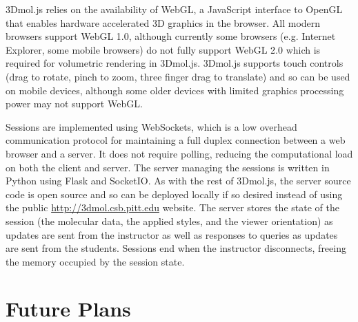 \documentclass[journal=jceda8,manuscript=article]{achemso}
\begin{document}
3Dmol.js relies on the availability of WebGL, a JavaScript interface to OpenGL that enables hardware accelerated 3D graphics in the browser.  All modern browsers support WebGL 1.0, although currently some browsers (e.g. Internet Explorer, some mobile browsers) do not fully support WebGL 2.0 which is required for volumetric rendering in 3Dmol.js.  3Dmol.js supports touch controls (drag to rotate, pinch to zoom, three finger drag to translate) and so can be used on mobile devices, although some older devices with limited graphics processing power may not support WebGL.

Sessions are implemented using WebSockets, which is a low overhead communication protocol for maintaining a full duplex connection between a web browser and a server.  It does not require polling, reducing the computational load on both the client and server. The server managing the sessions is written in Python using Flask and SocketIO.  As with the rest of 3Dmol.js, the server source code is open source and so can be deployed locally if so desired instead of using the public \url{http://3dmol.csb.pitt.edu} website. The server stores the state of the session (the molecular data, the applied styles, and the viewer orientation) as updates are sent from the instructor as well as responses to queries as updates are sent from the students.  Sessions end when the instructor disconnects, freeing the memory occupied by the session state.


\section{Future Plans}
\end{document}
